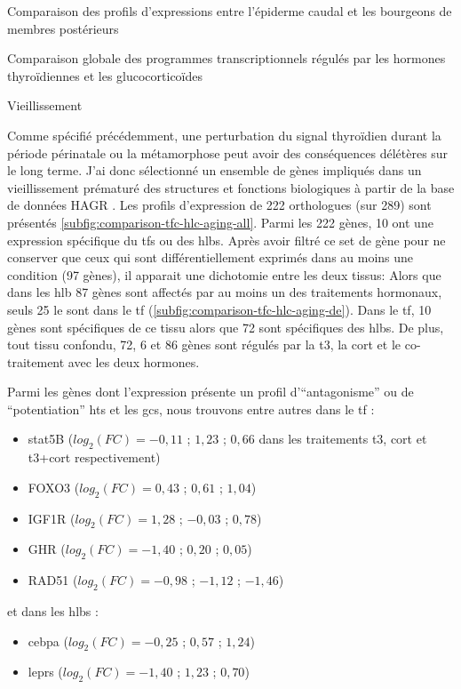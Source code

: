 \documentclass[../main.tex]{subfiles}
\begin{document}
\begin{chapter}{Comparaison des profils d'expressions entre l'épiderme caudal et les bourgeons de membres postérieurs}
\begin{section}{Comparaison globale des programmes transcriptionnels régulés par les hormones thyroïdiennes et les glucocorticoïdes}


\end{section}


\begin{section}{Vieillissement}

Comme spécifié précédemment, une perturbation du signal thyroïdien durant la période périnatale ou la métamorphose peut avoir des conséquences délétères sur le long terme.
J'ai donc sélectionné un ensemble de gènes impliqués dans un vieillissement prématuré des structures et fonctions biologiques à partir de la base de données HAGR \citep{DeMagalhaes2005}.
Les profils d'expression de 222 orthologues (sur 289) sont présentés \autoref{subfig:comparison-tfc-hlc-aging-all}.
Parmi les 222 gènes, 10 ont une expression spécifique du \glspl{tf} ou des \glspl{hlb}.
Après avoir filtré ce set de gène pour ne conserver que ceux qui sont différentiellement exprimés dans au moins une condition (97 gènes), il apparait une dichotomie entre les deux tissus:
Alors que dans les \gls{hlb} 87 gènes sont affectés par au moins un des traitements hormonaux, seuls 25 le sont dans le \gls{tf} (\autoref{subfig:comparison-tfc-hlc-aging-de}).
Dans le \gls{tf}, 10 gènes sont spécifiques de ce tissu alors que 72 sont spécifiques des \glspl{hlb}. 
De plus, tout tissu confondu, 72, 6 et 86 gènes sont régulés par la \gls{t3}, la \gls{cort} et le co-traitement avec les deux hormones.
\par
Parmi les gènes dont l'expression présente un profil d'``antagonisme'' ou de ``potentiation'' \glspl{ht} et les \glspl{gc}, nous trouvons entre autres dans le \gls{tf} :
\begin{itemize}
\item \gls{stat5}B ($log_2(FC)=-0,11$ ; $1,23$ ; $0,66$ dans les traitements \gls{t3}, \gls{cort} et \gls{t3}+\gls{cort} respectivement)
\item FOXO3 ($log_2(FC)=0,43$ ; $0,61$ ; $1,04$)
\item IGF1R ($log_2(FC)=1,28$ ; $-0,03$ ; $0,78$)
\item GHR ($log_2(FC)=-1,40$ ; $0,20$ ; $0,05$)
\item RAD51 ($log_2(FC)=-0,98$ ; $-1,12$ ; $-1,46$)
\end{itemize}
et dans les \glspl{hlb} :
\begin{itemize}
\item \gls{cebpa} ($log_2(FC)=-0,25$ ; $0,57$ ; $1,24$)
\item \glspl{lepr} ($log_2(FC)=-1,40$ ; $1,23$ ; $0,70$)

\end{itemize}
\end{section}
\end{chapter}
\end{document}
